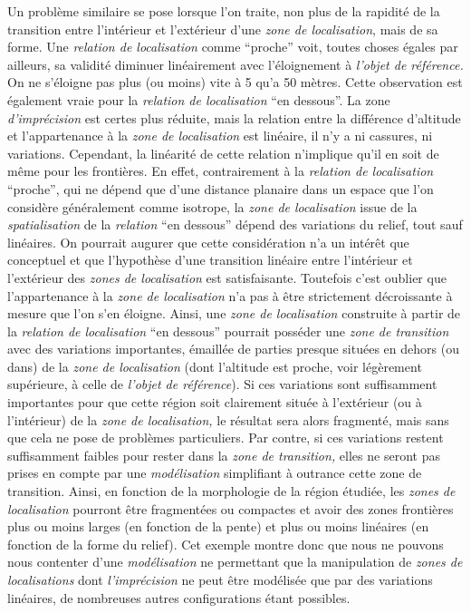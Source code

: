 Un problème similaire se pose lorsque l'on traite, non plus de la
rapidité de la transition entre l'intérieur et l'extérieur d'une
\emph{zone de localisation}, mais de sa forme. Une \emph{relation de
  localisation} comme \enquote{proche} voit, toutes choses égales par
ailleurs, sa validité diminuer linéairement avec l'éloignement à
\emph{l'objet de référence.} On ne s'éloigne pas plus (ou moins) vite
à 5 qu'a 50 mètres. Cette observation est également vraie pour la
\emph{relation de localisation} \enquote{en dessous}. La zone
\emph{d'imprécision} est certes plus réduite, mais la relation entre
la différence d'altitude et l'appartenance à la \emph{zone de
  localisation} est linéaire, il n'y a ni cassures, ni
variations. Cependant, la linéarité de cette relation n'implique qu'il
en soit de même pour les frontières. En effet, contrairement à la
\emph{relation de localisation} \enquote{proche}, qui ne dépend que
d'une distance planaire dans un espace que l'on considère généralement
comme isotrope, la \emph{zone de localisation} issue de la
\emph{spatialisation} de la \emph{relation} \enquote{en dessous}
dépend des variations du relief, tout sauf linéaires. On pourrait
augurer que cette considération n'a un intérêt que conceptuel et que
l'hypothèse d'une transition linéaire entre l'intérieur et l'extérieur
des \emph{zones de localisation} est satisfaisante. Toutefois c'est
oublier que l'appartenance à la \emph{zone de localisation} n'a pas à
être strictement décroissante à mesure que l'on s'en éloigne. Ainsi,
une \emph{zone de localisation} construite à partir de la
\emph{relation de localisation} \enquote{en dessous} pourrait posséder
une \emph{zone de transition} avec des variations importantes,
émaillée de parties presque situées en dehors (ou dans) de la
\emph{zone de localisation} (\ie dont l'altitude est proche, voir
légèrement supérieure, à celle de \emph{l'objet de référence}). Si ces
variations sont suffisamment importantes pour que cette région soit
clairement située à l'extérieur (ou à l'intérieur) de la \emph{zone de
  localisation,} le résultat sera alors fragmenté, mais sans que cela
ne pose de problèmes particuliers. Par contre, si ces variations
restent suffisamment faibles pour rester dans la \emph{zone de
  transition,} elles ne seront pas prises en compte par une
\emph{modélisation} simplifiant à outrance cette zone de
transition. Ainsi, en fonction de la morphologie de la région étudiée,
les \emph{zones de localisation} pourront être fragmentées ou
compactes et avoir des zones frontières plus ou moins larges (en
fonction de la pente) et plus ou moins linéaires (en fonction de la
forme du relief). Cet exemple montre donc que nous ne pouvons nous
contenter d'une \emph{modélisation} ne permettant que la manipulation
de \emph{zones de localisations} dont \emph{l'imprécision} ne peut
être modélisée que par des variations linéaires, de nombreuses autres
configurations étant possibles.

